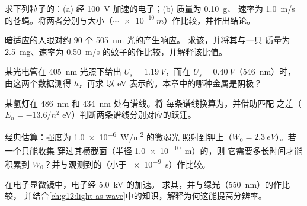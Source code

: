 \begin{exercise}[$\star\star$]\label{exo:g12:quantum-world:10}
求下列粒子的：(a) 经
\qty{100}{V} 加速的电子；(b) 质量为 \qty{0.10}{g}、
速率为 \qty{1.0}{m/s} 的苍蝇。将两者分别与大小（$\sim \qty{e-10}{m}$）作比较，并作出结论。
\end{exercise}

\begin{exercise}[$\star\star$]\label{exo:g12:quantum-world:11}
暗适应的人眼对约 $90$ 个 \qty{505}{nm} 光的产生响应。
求该，并将其与一只
质量为 \qty{2.5}{mg}、速率为 \qty{0.50}{m/s} 的蚊子的作比较，并解释该比值。
\end{exercise}

\begin{exercise}[$\star\star\star$]\label{exo:g12:quantum-world:12}
某光电管在 \qty{405}{nm} 光照下给出 $U_s = \qty{1.19}{V}$，而在 $U_s =
\qty{0.40}{V}$（\qty{546}{nm}）时，由这两个数据测得 $h$，再求
以 \unit{eV} 表示的。本章中的哪种金属是阴极？
\end{exercise}

\begin{exercise}[$\star\star\star$]\label{exo:g12:quantum-world:13}
某氢灯在 \qty{486}{nm} 和 \qty{434}{nm} 处有谱线。将
每条谱线换算为，并借助匹配
之差（$E_n = -13.6/n^2$ \unit{eV}）判断两条谱线分别对应的跃迁。
\end{exercise}

\begin{exercise}[$\star\star\star$]\label{exo:g12:quantum-world:14}
经典估算：强度为 \qty{1.0e-6}{W/m^2} 的微弱光
照射到钾上（$W_0 = \qty{2.3}{eV}$）。若一个只能收集
穿过其横截面（半径 \qty{1.0e-10}{m}）的，则
它需要多长时间才能积累到 $W_0$？并与观测到的（小于 \qty{e-9}{s}）作比较。
\end{exercise}

\begin{exercise}[$\star\star\star$]\label{exo:g12:quantum-world:15}
在电子显微镜中，电子经 \qty{5.0}{kV} 的加速。
求其，并与绿光（\qty{550}{nm}）的作比较，
并结合\cref{ch:g12:light-as-wave}中的知识，解释为何这能提高分辨率。
\end{exercise}

